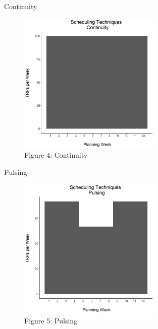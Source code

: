 \documentclass[pdf]{beamer}
\theoremstyle{remark}
\theoremstyle{definition}
\begin{document}
\begin{frame}[t]{Continuity}
\begin{figure}[htbp]
  \captionsetup{justification=centering}
  \includegraphics[height=6.8cm, trim=0.3cm 0.3cm 0.3cm 0.3cm width=6.8cm]{../BUSA_603_Ad_Response/Output/m5_0_b.png}
  \caption{Figure {\color{franklinblue} 4}: Continuity}
\end{figure}
\end{frame}

\begin{frame}[t]{Pulsing}
\begin{figure}[htbp]
  \captionsetup{justification=centering}
  \includegraphics[height=6.8cm, trim=0.3cm 0.3cm 0.3cm 0.3cm width=6.8cm]{../BUSA_603_Ad_Response/Output/m5_0_c.png}
  \caption{Figure {\color{franklinblue} 5}: Pulsing}
\end{figure}
\end{frame}
\end{document}
